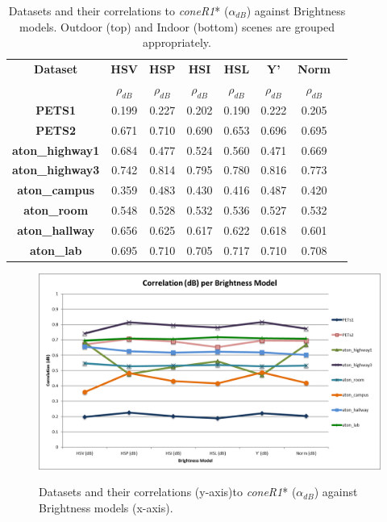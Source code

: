 \begin{table}
\centering
\caption{Datasets and their correlations to \textit{coneR1}* ($\alpha_{dB}$) against Brightness models. Outdoor (top) and Indoor (bottom) scenes are grouped appropriately.}
\begin{tabular}{ |c|c|c|c|c|c|c|c| }
	\hline
	\textbf{Dataset} & \textbf{HSV} & \textbf{HSP} & \textbf{HSI} & \textbf{HSL}& \textbf{Y'} & \textbf{Norm} \\
		\textbf{} & $\rho_{dB}$ & $\rho_{dB}$ & $\rho_{dB}$ & $\rho_{dB}$ & $\rho_{dB}$ & $\rho_{dB}$ \\
	\hline
	\hline
	\textbf{PETS1} & 0.199 & 0.227 & 0.202 & 0.190 & 0.222 & 0.205 \\
	\hline
	\textbf{PETS2} & 0.671 & 0.710 & 0.690 & 0.653 & 0.696 & 0.695 \\
	\hline
	\textbf{aton\_highway1} & 0.684 & 0.477 & 0.524 & 0.560 & 0.471 & 0.669 \\
	\hline
	\textbf{aton\_highway3} & 0.742 & 0.814 & 0.795 & 0.780 & 0.816 & 0.773 \\
	\hline
	\textbf{aton\_campus} & 0.359 & 0.483 & 0.430 & 0.416 & 0.487 & 0.420 \\
	\hline
	\hline
	\textbf{aton\_room} & 0.548 & 0.528 & 0.532 & 0.536 & 0.527 & 0.532 \\
	\hline
	\textbf{aton\_hallway} & 0.656 & 0.625 & 0.617 & 0.622 & 0.618 & 0.601 \\
	\hline
	\textbf{aton\_lab} & 0.695 & 0.710 & 0.705 & 0.717 & 0.710 & 0.708 \\
	\hline
\end{tabular}

\label{table:brightness_corr_db}
\end{table}

\begin{figure}
  \caption{Datasets and their correlations (y-axis)to \textit{coneR1}* ($\alpha_{dB}$) against Brightness models (x-axis).}
  \includegraphics[width=\linewidth]{figures/correlation_x_db.jpg}
\label{fig:brightness_corr_db}
\end{figure}

